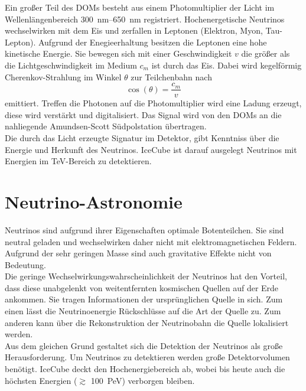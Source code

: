 Ein großer Teil des DOMs besteht aus einem Photomultiplier der Licht im Wellenlängenbereich \SIrange{300}{650}{\nano\metre} registriert.
Hochenergetische Neutrinos wechselwirken mit dem Eis und zerfallen in Leptonen (Elektron, Myon, Tau-Lepton).
Aufgrund der Enegieerhaltung besitzen die Leptonen eine hohe kinetische Energie.
Sie bewegen sich mit einer Geschwindigkeit $v$ die größer als die Lichtgeschwindigkeit im Medium $c_m$ ist durch das Eis.
Dabei wird kegelförmig Cherenkov-Strahlung\cite{landau2013electrodynamics} im Winkel $\theta$ zur Teilchenbahn nach
\begin{equation*}
\cos(\theta) = \frac{c_m}{v}
\end{equation*}
emittiert.
Treffen die Photonen auf die Photomultiplier wird eine Ladung erzeugt, diese wird verstärkt und digitalisiert.
Das Signal wird von den DOMs an die nahliegende Amundsen-Scott Südpolstation übertragen.
\\
Die durch das Licht erzeugte Signatur im Detektor, gibt Kenntniss über die Energie und Herkunft des Neutrinos.
IceCube ist darauf ausgelegt Neutrinos mit Energien im \si{\tera\eV}-Bereich\cite{Ahlers_2018} zu detektieren.

\section{Neutrino-Astronomie}
Neutrinos sind aufgrund ihrer Eigenschaften optimale Botenteilchen.
Sie sind neutral geladen und wechselwirken daher nicht mit elektromagnetischen Feldern.
Aufgrund der sehr geringen Masse sind auch gravitative Effekte nicht von Bedeutung.
\\
Die geringe Wechselwirkungswahrscheinlichkeit der Neutrinos hat den Vorteil, dass diese unabgelenkt von weitentfernten kosmischen Quellen auf der Erde ankommen.
Sie tragen Informationen der ursprünglichen Quelle in sich.
Zum einen lässt die Neutrinoenergie Rückschlüsse auf die Art der Quelle zu.
Zum anderen kann über die Rekonstruktion der Neutrinobahn die Quelle lokalisiert werden.
\\
Aus dem gleichen Grund gestaltet sich die Detektion der Neutrinos als große Herausforderung.
Um Neutrinos zu detektieren werden große Detektorvolumen benötigt.
IceCube deckt den Hochenergiebereich ab, wobei bis heute auch die höchsten Energien ($\gtrsim$ \SI{100}{\peta\eV}) verborgen bleiben.

